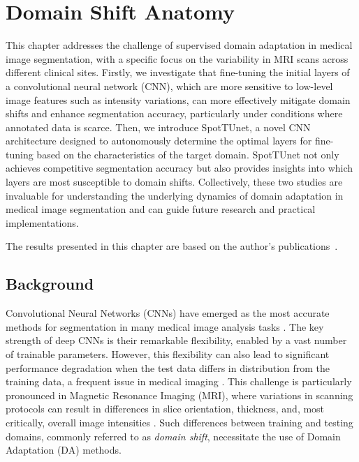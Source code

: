 

\chapter{Domain Shift Anatomy}
\label{chap:mri}


This chapter addresses the challenge of supervised domain adaptation in medical image segmentation, with a specific focus on the variability in MRI scans across different clinical sites. Firstly, we investigate that fine-tuning the initial layers of a convolutional neural network (CNN), which are more sensitive to low-level image features such as intensity variations, can more effectively mitigate domain shifts and enhance segmentation accuracy, particularly under conditions where annotated data is scarce. Then, we introduce SpotTUnet, a novel CNN architecture designed to autonomously determine the optimal layers for fine-tuning based on the characteristics of the target domain. SpotTUnet not only achieves competitive segmentation accuracy but also provides insights into which layers are most susceptible to domain shifts. Collectively, these two studies are invaluable for understanding the underlying dynamics of domain adaptation in medical image segmentation and can guide future research and practical implementations.

The results presented in this chapter are based on the author’s publications~\cite{shirokikh2020first,zakazov2021anatomy}.


\section{Background}

Convolutional Neural Networks (CNNs) have emerged as the most accurate methods for segmentation in many medical image analysis tasks \cite{shen2017deep}. The key strength of deep CNNs is their remarkable flexibility, enabled by a vast number of trainable parameters. However, this flexibility can also lead to significant performance degradation when the test data differs in distribution from the training data, a frequent issue in medical imaging \cite{da_survey_2018}. This challenge is particularly pronounced in Magnetic Resonance Imaging (MRI), where variations in scanning protocols can result in differences in slice orientation, thickness, and, most critically, overall image intensities \cite{dann_medim,glocker2019machine,orbes2019multi}. Such differences between training and testing domains, commonly referred to as \textit{domain shift}, necessitate the use of Domain Adaptation (DA) methods.

